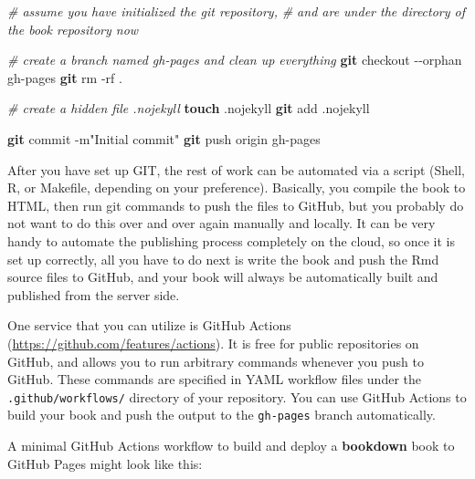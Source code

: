 \documentclass[
  12pt,
]{krantz}
\newenvironment{Shaded}{\begin{snugshade}}{\end{snugshade}}
\newcommand{\AttributeTok}[1]{\textcolor[rgb]{0.13,0.29,0.53}{#1}}
\newcommand{\CommentTok}[1]{\textcolor[rgb]{0.56,0.35,0.01}{\textit{#1}}}
\newcommand{\FunctionTok}[1]{\textcolor[rgb]{0.13,0.29,0.53}{\textbf{#1}}}
\newcommand{\NormalTok}[1]{#1}
\newcommand{\StringTok}[1]{\textcolor[rgb]{0.31,0.60,0.02}{#1}}
\theoremstyle{definition}
\theoremstyle{definition}
\theoremstyle{definition}
\theoremstyle{definition}
\theoremstyle{remark}
\begin{document}
\begin{Shaded}
\begin{Highlighting}[]
\CommentTok{\# assume you have initialized the git repository,}
\CommentTok{\# and are under the directory of the book repository now}

\CommentTok{\# create a branch named gh{-}pages and clean up everything}
\FunctionTok{git}\NormalTok{ checkout }\AttributeTok{{-}{-}orphan}\NormalTok{ gh{-}pages}
\FunctionTok{git}\NormalTok{ rm }\AttributeTok{{-}rf}\NormalTok{ .}

\CommentTok{\# create a hidden file .nojekyll}
\FunctionTok{touch}\NormalTok{ .nojekyll}
\FunctionTok{git}\NormalTok{ add .nojekyll}

\FunctionTok{git}\NormalTok{ commit }\AttributeTok{{-}m}\StringTok{"Initial commit"}
\FunctionTok{git}\NormalTok{ push origin gh{-}pages}
\end{Highlighting}
\end{Shaded}

After you have set up GIT, the rest of work can be automated via a script (Shell, R, or Makefile, depending on your preference). Basically, you compile the book to HTML, then run git commands to push the files to GitHub, but you probably do not want to do this over and over again manually and locally. It can be very handy to automate the publishing process completely on the cloud, so once it is set up correctly, all you have to do next is write the book and push the Rmd source files to GitHub, and your book will always be automatically built and published from the server side.

One service that you can utilize is GitHub Actions (\url{https://github.com/features/actions}). It is free for public repositories on GitHub, and allows you to run arbitrary commands whenever you push to GitHub. These commands are specified in YAML workflow files under the \texttt{.github/workflows/} directory of your repository. You can use GitHub Actions to build your book and push the output to the \texttt{gh-pages} branch automatically.

A minimal GitHub Actions workflow to build and deploy a \textbf{bookdown} book to GitHub Pages might look like this:
\end{document}
